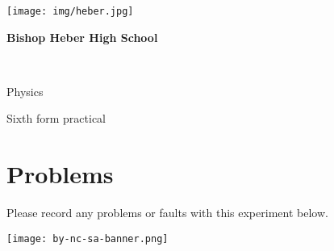 \documentclass[a4paper,12pt]{article}
\begin{document}
\thispagestyle{empty}

\noindent\begin{minipage}{0.1\textwidth}
\noindent\texttt{[image: img/heber.jpg]}
\end{minipage}
\begin{minipage}{0.8\textwidth}
\begin{Large}\textcolor{heberblue}{\textbf{Bishop Heber High School}}\end{Large}
\end{minipage}\\

\bfseries

\vspace{4em}

\noindent \begin{Huge}Physics\end{Huge}

\vspace*{2em}

\noindent \begin{Large}Sixth form practical\end{Large}

\normalsize
\rmfamily

\vspace*{-1em}



\section{Problems}
Please record any problems or faults with this experiment below.

\noindent\framebox[\textwidth]{
\begin{minipage}[l]{\fill}
\hfill{}

\vspace{3cm}

\end{minipage}
}

\vfill

\noindent\texttt{[image: by-nc-sa-banner.png]}
\end{document}
